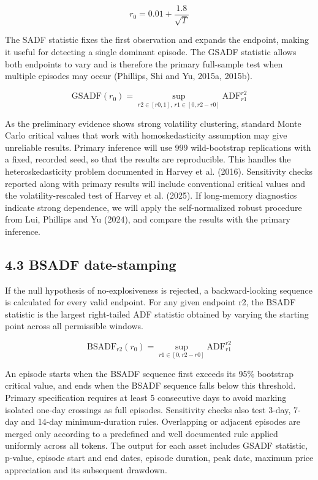\documentclass[11pt,a4paper,onecolumn]{article}
\begin{document}
\[
r_0=0.01+\frac{1.8}{\sqrt{T}}
\]

The SADF statistic fixes the first observation and expands the endpoint, making it useful for detecting a single dominant episode. The GSADF statistic allows both endpoints to vary and is therefore the primary full-sample test when multiple episodes may occur (Phillips, Shi and Yu, 2015a, 2015b).

\[
\mathrm{GSADF}(r_0)=\sup_{r2\in[r0,1],\ r1\in[0,r2-r0]}\mathrm{ADF}_{r1}^{r2}
\]

As the preliminary evidence shows strong volatility clustering, standard Monte Carlo critical values that work with homoskedasticity assumption may give unreliable results. Primary inference will use 999 wild-bootstrap replications with a fixed, recorded seed, so that the results are reproducible. This handles the heteroskedasticity problem documented in Harvey et al. (2016). Sensitivity checks reported along with primary results will include conventional critical values and the volatility-rescaled test of Harvey et al. (2025). If long-memory diagnostics indicate strong dependence, we will apply the self-normalized robust procedure from Lui, Phillips and Yu (2024), and compare the results with the primary inference. 

\subsection{4.3 BSADF date-stamping}

If the null hypothesis of no-explosiveness is rejected, a backward-looking sequence is calculated for every valid endpoint. For any given endpoint r2, the BSADF statistic is the largest right-tailed ADF statistic obtained by varying the starting point across all permissible windows.

\[
\mathrm{BSADF}_{r2}(r_0)=\sup_{r1\in[0,r2-r0]}\mathrm{ADF}_{r1}^{r2}
\]

An episode starts when the BSADF sequence first exceeds its 95\% bootstrap critical value, and ends when the BSADF sequence falls below this threshold. Primary specification requires at least 5 consecutive days to avoid marking isolated one-day crossings as full episodes. Sensitivity checks also test 3-day, 7-day and 14-day minimum-duration rules. Overlapping or adjacent episodes are merged only according to a predefined and well documented rule applied uniformly across all tokens. The output for each asset includes GSADF statistic, p-value, episode start and end dates, episode duration, peak date, maximum price appreciation and its subsequent drawdown.
\end{document}
